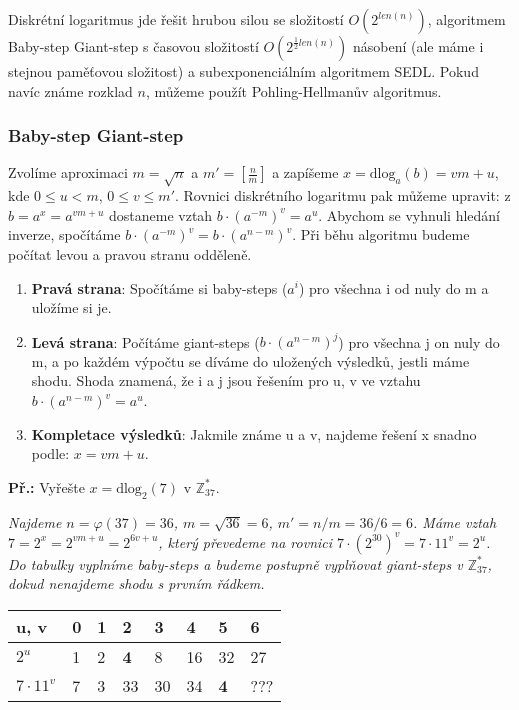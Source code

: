 \documentclass[10pt,a4paper]{article}
\begin{document}
Diskrétní logaritmus jde řešit hrubou silou se složitostí $O(2^{len(n)})$, algoritmem Baby-step Giant-step s časovou složitostí $O(2^{\frac{1}{2}len(n)})$ násobení (ale máme i stejnou paměťovou složitost) a subexponenciálním algoritmem SEDL. Pokud navíc známe rozklad $n$, můžeme použít Pohling-Hellmanův algoritmus.

\subsubsection{Baby-step Giant-step}
Zvolíme aproximaci $m = \sqrt{n}$ a $m' = [ \frac{n}{m}]$ a zapíšeme $x = \text{dlog}_a (b) = vm + u$, kde $0 \leq u < m$, $0 \leq v \leq m'$. Rovnici diskrétního logaritmu pak můžeme upravit: z $b = a^x = a^{vm + u}$ dostaneme vztah $b\cdot (a^{-m})^v = a^u$. Abychom se vyhnuli hledání inverze, spočítáme $b\cdot (a^{-m})^v = b\cdot (a^{n-m})^v$. Při běhu algoritmu budeme počítat levou a pravou stranu odděleně. 

\begin{enumerate}
\item \textbf{Pravá strana}: Spočítáme si baby-steps ($a^i$) pro všechna i od nuly do m a uložíme si je.
\item\textbf{Levá strana}: Počítáme giant-steps ($b\cdot (a^{n-m})^j$) pro všechna j on nuly do m, a po každém výpočtu se díváme do uložených výsledků, jestli máme shodu. Shoda znamená, že i a j jsou řešením pro u, v ve vztahu $b\cdot (a^{n-m})^v = a^u$.
\item \textbf{Kompletace výsledků}: Jakmile známe u a v, najdeme řešení x snadno podle: $x = vm + u$.
\end{enumerate}

\textbf{Př.:} Vyřešte $x = \text{dlog}_2 (7)$ v $\mathbb{Z}_{37}^*$.

\textit{Najdeme $n = \varphi(37) = 36$, $m = \sqrt{36} = 6$, $m' = n/m = 36/6 = 6$. Máme vztah $7 = 2^x = 2^{vm + u} = 2^{6v + u}$, který převedeme na rovnici $7\cdot (2^{30})^v =7\cdot 11^v = 2^u$. Do tabulky vyplníme baby-steps a budeme postupně vyplňovat giant-steps v $\mathbb{Z}_{37}^*$, dokud nenajdeme shodu s prvním řádkem.}

\begin{table}[h!]
\centering
\begin{tabular}{|p{1cm}|p{1cm}|p{1cm}|p{1cm}|p{1cm}|p{1cm}|p{1cm}|p{1cm}|}
\hline
u, v & 0 & 1 & 2 &3 & 4 & 5 & 6\\
\hline
\hline
$2^u$ & 1 & 2 & \textbf{4} & 8 & 16 & 32 & 27\\
\hline
$7\cdot 11^v$ & 7 & 3 & 33 & 30 & 34 & \textbf{4} & ??? \\
\hline
\end{tabular}
\end{table}
\end{document}
